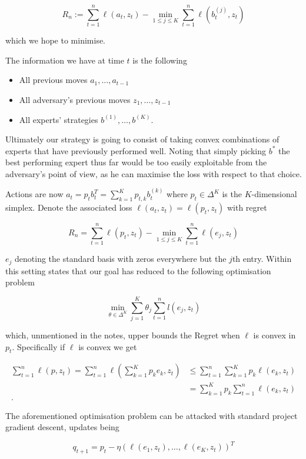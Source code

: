 $$
	R_n:= 
	\sum_{t=1}^{n} \ell(a_t,z_t) - \min_{1 \leq j \leq K} \sum_{t=1}^n \ell(b_t^{(j)},z_t)
$$

which we hope to minimise. 

The information we have at time $t$ is the following 

\begin{itemize}
\item All previous moves $a_1,\dots,a_{t-1}$
\item All adversary's previous moves $z_1,\dots,z_{t-1}$ 
\item All experts' strategies $b^{(1)},\dots,b^{(K)}$. 
\end{itemize}

Ultimately our strategy is going to consist of taking convex combinations of experts that have previously performed well. Noting that simply picking $b^{*}$ the best performing expert thus far would be too easily exploitable from the adversary's point of view, as he can maximise the loss with respect to that choice. 

Actions are now $a_t = p_t b^T_t = \sum_{k=1}^K p_{t,k} b_t^{(k)} $ where $p_t \in \Delta^{K}$ is the $K$-dimensional simplex. Denote the associated loss $\ell(a_t,z_t) = \ell(p_t,z_t)$ with regret 

$$
	R_n = \sum_{t=1}^n \ell(p_t,z_t) - \min_{1 \leq j \leq K} \sum_{t=1}^n \ell(e_j,z_t)
$$

$e_j$ denoting the standard basis with zeros everywhere but the $j$th entry. Within this setting \cite{rigollet} states that our goal has reduced to the following optimisation problem 

$$
	\min_{\theta \in \Delta^{K}} \sum_{j=1}^K \theta_j \sum_{t=1}^n l(e_j,z_t)
$$

which, unmentioned in the notes, upper bounds the Regret when $\ell$ is convex in $p_t$. Specifically if $\ell$ is convex we get

\begin{align*}
\sum_{t=1}^n \ell(p,z_t) = \sum_{t=1}^n \ell \left(\sum_{k=1}^K p_k e_k ,z_t \right) & \leq \sum_{t=1}^n \sum_{k=1}^K  p_k \ell(e_k ,z_t)\\
& = \sum_{k=1}^K p_k  \sum_{t=1}^n   \ell(e_k ,z_t)\\.
\end{align*}


The aforementioned optimisation problem can be attacked with standard project gradient descent, updates being 

$$
	q_{t+1} = p_t - \eta \left( \ell(e_1,z_t),\dots,\ell(e_K,z_t)\right)^T
$$

